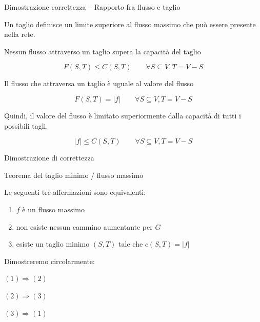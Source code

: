 \begin{frame}{Dimostrazione correttezza -- Rapporto fra flusso e taglio}

Un taglio definisce un limite superiore al flusso massimo che può
essere presente nella rete. 
\BIL
\item Nessun flusso attraverso un taglio supera la capacità del taglio

\[
  F(S,T) \leq C(S,T) \qquad \forall S \subseteq V, T = V-S
\]
\item Il flusso che attraversa un taglio è uguale al valore del flusso

\[
  F(S,T) = |f| \qquad \forall S \subseteq V, T = V-S
\]
\item Quindi, il valore del flusso è limitato superiormente dalla capacità
di tutti i possibili tagli. 

\[
|f| \leq C(S,T) \qquad \forall S \subseteq V, T = V-S
\]
\EIL

\end{frame}

\begin{frame}{Dimostrazione di correttezza}


\end{frame}

\begin{frame}{Teorema del taglio minimo / flusso massimo}

\vspace{-9pt}
\begin{myboxtitle}[Teorema]
Le seguenti tre affermazioni sono equivalenti:
\begin{enumerate}
\item $f$ è un \alert{flusso massimo}
\item non esiste nessun cammino aumentante per $G$
\item esiste un \alert{taglio minimo} $(S,T)$ tale che $c(S,T) = |f|$
\end{enumerate}
\end{myboxtitle}

\bigskip
Dimostreremo circolarmente:
\BIL
\item $(1) \Rightarrow (2)$
\item $(2) \Rightarrow (3)$
\item $(3) \Rightarrow (1)$
\EIL

\end{frame}

